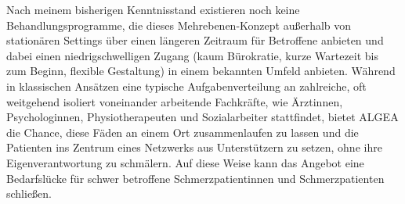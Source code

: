 \documentclass[
  parskip=half,
  DIV=11,
]{scrartcl}
\begin{document}
\begin{multicols}{2}
Nach meinem bisherigen Kenntnisstand existieren noch keine Behandlungsprogramme, die dieses Mehrebenen-Konzept außerhalb von stationären
Settings über einen längeren Zeitraum für Betroffene anbieten und dabei einen niedrigschwelligen
Zugang (kaum Bürokratie, kurze Wartezeit bis zum Beginn, flexible Gestaltung) in einem bekannten
Umfeld anbieten. Während in klassischen Ansätzen eine typische Aufgabenverteilung an zahlreiche, oft
weitgehend isoliert voneinander arbeitende Fachkräfte, wie Ärztinnen, Psychologinnen,
Physiotherapeuten und Sozialarbeiter stattfindet, bietet ALGEA die Chance, diese Fäden an einem Ort
zusammenlaufen zu lassen und die Patienten ins Zentrum eines Netzwerks aus Unterstützern zu setzen,
ohne ihre Eigenverantwortung zu schmälern. Auf diese Weise kann das Angebot eine Bedarfslücke für
schwer betroffene Schmerzpatientinnen und Schmerzpatienten schließen.

\end{multicols}
\end{document}

